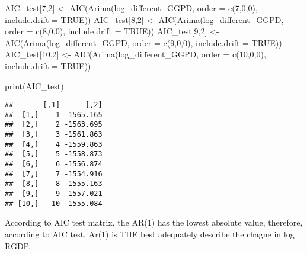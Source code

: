\documentclass[
]{article}
\newenvironment{Shaded}{\begin{snugshade}}{\end{snugshade}}
\newcommand{\AttributeTok}[1]{\textcolor[rgb]{0.77,0.63,0.00}{#1}}
\newcommand{\ConstantTok}[1]{\textcolor[rgb]{0.00,0.00,0.00}{#1}}
\newcommand{\DecValTok}[1]{\textcolor[rgb]{0.00,0.00,0.81}{#1}}
\newcommand{\FunctionTok}[1]{\textcolor[rgb]{0.00,0.00,0.00}{#1}}
\newcommand{\NormalTok}[1]{#1}
\newcommand{\OtherTok}[1]{\textcolor[rgb]{0.56,0.35,0.01}{#1}}
\begin{document}
\begin{Shaded}
\begin{Highlighting}[]
\NormalTok{AIC\_test[}\DecValTok{7}\NormalTok{,}\DecValTok{2}\NormalTok{] }\OtherTok{\textless{}{-}} \FunctionTok{AIC}\NormalTok{(}\FunctionTok{Arima}\NormalTok{(log\_different\_GGPD, }\AttributeTok{order =} \FunctionTok{c}\NormalTok{(}\DecValTok{7}\NormalTok{,}\DecValTok{0}\NormalTok{,}\DecValTok{0}\NormalTok{), }\AttributeTok{include.drift =} \ConstantTok{TRUE}\NormalTok{))}
\NormalTok{AIC\_test[}\DecValTok{8}\NormalTok{,}\DecValTok{2}\NormalTok{] }\OtherTok{\textless{}{-}} \FunctionTok{AIC}\NormalTok{(}\FunctionTok{Arima}\NormalTok{(log\_different\_GGPD, }\AttributeTok{order =} \FunctionTok{c}\NormalTok{(}\DecValTok{8}\NormalTok{,}\DecValTok{0}\NormalTok{,}\DecValTok{0}\NormalTok{), }\AttributeTok{include.drift =} \ConstantTok{TRUE}\NormalTok{))}
\NormalTok{AIC\_test[}\DecValTok{9}\NormalTok{,}\DecValTok{2}\NormalTok{] }\OtherTok{\textless{}{-}} \FunctionTok{AIC}\NormalTok{(}\FunctionTok{Arima}\NormalTok{(log\_different\_GGPD, }\AttributeTok{order =} \FunctionTok{c}\NormalTok{(}\DecValTok{9}\NormalTok{,}\DecValTok{0}\NormalTok{,}\DecValTok{0}\NormalTok{), }\AttributeTok{include.drift =} \ConstantTok{TRUE}\NormalTok{))}
\NormalTok{AIC\_test[}\DecValTok{10}\NormalTok{,}\DecValTok{2}\NormalTok{] }\OtherTok{\textless{}{-}} \FunctionTok{AIC}\NormalTok{(}\FunctionTok{Arima}\NormalTok{(log\_different\_GGPD, }\AttributeTok{order =} \FunctionTok{c}\NormalTok{(}\DecValTok{10}\NormalTok{,}\DecValTok{0}\NormalTok{,}\DecValTok{0}\NormalTok{), }\AttributeTok{include.drift =} \ConstantTok{TRUE}\NormalTok{))}

                      
\FunctionTok{print}\NormalTok{(AIC\_test)}
\end{Highlighting}
\end{Shaded}

\begin{verbatim}
##       [,1]      [,2]
##  [1,]    1 -1565.165
##  [2,]    2 -1563.695
##  [3,]    3 -1561.863
##  [4,]    4 -1559.863
##  [5,]    5 -1558.873
##  [6,]    6 -1556.874
##  [7,]    7 -1554.916
##  [8,]    8 -1555.163
##  [9,]    9 -1557.021
## [10,]   10 -1555.084
\end{verbatim}

According to AIC test matrix, the AR(1) has the lowest absolute value,
therefore, according to AIC test, Ar(1) is THE best adequately describe
the chagne in log RGDP.

\hypertarget{section}{%
\subsubsection{}\label{section}}
\end{document}
